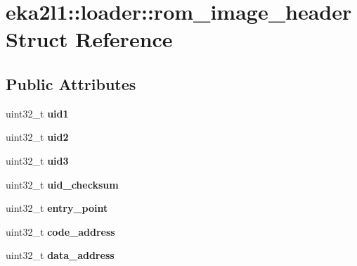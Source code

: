 \hypertarget{structeka2l1_1_1loader_1_1rom__image__header}{}\section{eka2l1\+:\+:loader\+:\+:rom\+\_\+image\+\_\+header Struct Reference}
\label{structeka2l1_1_1loader_1_1rom__image__header}
\subsection*{Public Attributes}
\begin{DoxyCompactItemize}
\item 
\mbox{\label{structeka2l1_1_1loader_1_1rom__image__header_ac3ad9a4ac414823de7a1299f36af027f}} 
uint32\+\_\+t {\bfseries uid1}
\item 
\mbox{\label{structeka2l1_1_1loader_1_1rom__image__header_aabc134cdfc0371e30ef80be047ceda75}} 
uint32\+\_\+t {\bfseries uid2}
\item 
\mbox{\label{structeka2l1_1_1loader_1_1rom__image__header_a543b28062faee180bc20d7ef12afe5ac}} 
uint32\+\_\+t {\bfseries uid3}
\item 
\mbox{\label{structeka2l1_1_1loader_1_1rom__image__header_aab7aa6cbbf58c5e95311f6720a616b17}} 
uint32\+\_\+t {\bfseries uid\+\_\+checksum}
\item 
\mbox{\label{structeka2l1_1_1loader_1_1rom__image__header_a099f82f4da51776d1ff8ae47f69849fb}} 
uint32\+\_\+t {\bfseries entry\+\_\+point}
\item 
\mbox{\label{structeka2l1_1_1loader_1_1rom__image__header_a7b2eaca87334e8c9e2bb6b45dd327664}} 
uint32\+\_\+t {\bfseries code\+\_\+address}
\item 
\mbox{\label{structeka2l1_1_1loader_1_1rom__image__header_a09d467a1974a6ce452b6f0580f2aff6b}} 
uint32\+\_\+t {\bfseries data\+\_\+address}

\end{DoxyCompactItemize}
